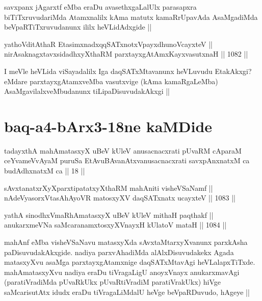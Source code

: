 \begin{artha}
savxpanx jAgarxtf eMba eraDu avasethxgaLalUlx parasapxra biTiTxruvudariMda Atamxnalilx kAma matutx kamaRrUpavAda AsaMgadiMda beVpaRTiTxruvudanunx ililx heVLidAdxgide ||
\end{artha}

\begin{shl}
yathoVditAthaR EtasimxnadxqqSATxnotxV\s payxdhunoVcayxteV ||  \\
nirAsaknagxtavxsidadhxyXthaRM parxtayxgAtAmxKayxvasutxnaH ||  1082 ||  
\end{shl}

\begin{artha}
I meVle heVLida viSayadalilx Iga daqSATxMtavanunx heVLuvudu EtakAkxgi? eMdare parxtayxgAtamxveMba vasutxvige (kAma kamaRgaLeMba) AsaMgavilalxveMbudanunx tiLipaDisuvudakAkxgi ||
\end{artha}

\section*{baq-a4-bArx3-18ne kaMDide}

\begin{shl}
tadayxthA mahAmatasxyX uBeV kUleV anusacnacxrati pUvaRM cAparaM ceYvameVvAyaM puruSa EtAvuBAvanAtxvanusacnacxrati savxpAnxnatxM ca budAdhxnatxM ca || 18 ||
\end{shl}



\begin{shl}
sAvxtanatxrXyXparxtipatatxyXthaRM mahAniti visheVSaNamf || \\
nAdeVyasorxVtasA\s hAyoVR matosxyXV daqSATxnatx ucayxteV ||  1083 ||  
\end{shl}
				
\begin{shl}
yathA sinodhxVmaRhAmatasxyX uBeV kUleV mithaH paqthakf || \\
anukarxmeVNa saMcaranamxtosxyXV\s nayxH kUlatoV mataH ||  1084 ||  
\end{shl}

\begin{artha}
mahAnf eMba visheVSaNavu matasxyXda sAvxtaMtarxyXvanunx parxkAsha paDisuvudakAkxgide. nadiya parxvAhadiMda alAlxDisuvudakekx Agada matasxyXvu asaMga parxtayxgAtamxnige daqSATxMtavAgi heVLalapxTiTxde. mahAmatasxyXvu nadiya eraDu tiVragaLigU anoyxVnayx anukarxmavAgi (paratiVradiMda pUvaRkUkx pUvaRtiVradiM paratiVrakUkx) hiVge saMcarisutAtx idudx eraDu tiVragaLiMdalU heVge beVpaRDuvudo, hAgeye ||
\end{artha}

